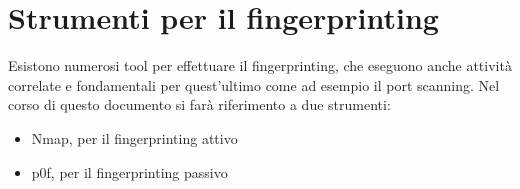 \section{Strumenti per il fingerprinting}
Esistono numerosi tool per effettuare il fingerprinting, che eseguono anche attività correlate e fondamentali per quest'ultimo come ad esempio il port scanning.
Nel corso di questo documento si farà riferimento a due strumenti:
\begin{itemize}
	\item Nmap, per il fingerprinting attivo
	\item p0f, per il fingerprinting passivo
\end{itemize}


	






